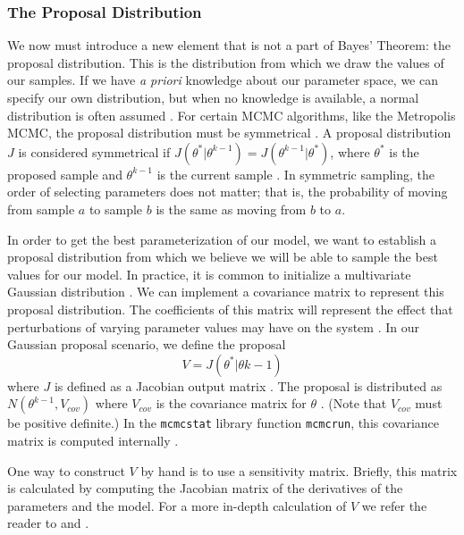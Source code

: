 \documentclass{article}
\begin{document}
\subsubsection{The Proposal Distribution} We now must introduce a new element that is not a part of Bayes' Theorem: the proposal distribution. This is the distribution from which we draw the values of our samples. If we have \textit{a priori} knowledge about our parameter space, we can specify our own distribution, but when no knowledge is available, a normal distribution is often assumed \cite{astrostats} \cite{bayesprior}. For certain MCMC algorithms, like the Metropolis MCMC, the proposal distribution must be symmetrical \cite{smithCh8}. A proposal distribution $J$ is considered symmetrical if $J(\theta^{*}|\theta^{k-1}) = J(\theta^{k-1}|\theta^{*})$, where $\theta^*$ is the proposed sample and $\theta^{k-1}$ is the current sample \cite{smithCh8}. In symmetric sampling, the order of selecting parameters does not matter; that is, the probability of moving from sample $a$ to sample $b$ is the same as moving from $b$ to $a$.
\par In order to get the best parameterization of our model, we want to establish a proposal distribution from which we believe we will be able to sample the best values for our model. In practice, it is common to initialize a multivariate Gaussian distribution \cite{astrostats} \cite{mcmcstatlib}. We can implement a covariance matrix to represent this proposal distribution. The coefficients of this matrix will represent the effect that perturbations of varying parameter values may have on the system \cite{sensitivity_matrices1}. In our Gaussian proposal scenario, we define the proposal 
\begin{equation} \label{eq:8mcmc}
V = J(\theta^*|\theta{k-1})
\end{equation}
where $J$ is defined as a Jacobian output matrix \cite{sensitivity_matrices1} \cite{smithCh8}. The proposal is distributed as $N(\theta^{k-1}, V_{cov})$ where $V_{cov}$ is the covariance matrix for $\theta$ \cite{smithCh8}. (Note that $V_{cov}$ must be positive definite.) In the \texttt{mcmcstat} library function \texttt{mcmcrun}, this covariance matrix is computed internally \cite{mcmcstatlib}.
\par One way to construct $V$ by hand is to use a sensitivity matrix. Briefly, this matrix is calculated by computing the Jacobian matrix of the derivatives of the parameters and the model. For a more in-depth calculation of $V$ we refer the reader to \cite{smithCh8} and \cite{sensitivity_matrices1}.
\end{document}
